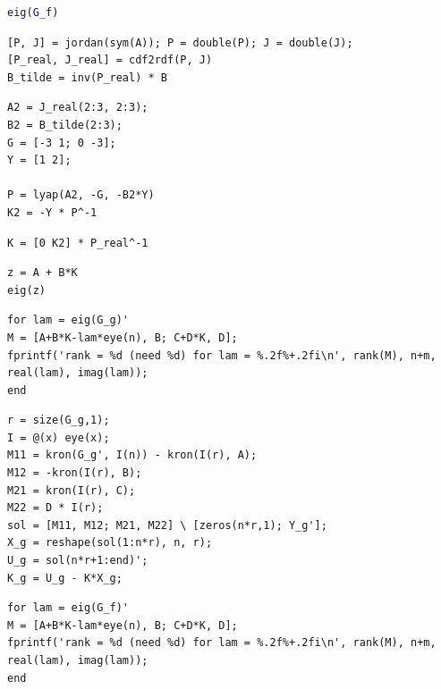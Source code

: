 \documentclass[a4paper,12pt]{article}
\begin{document}
\begin{lstlisting}[caption={Спектр \(\Gamma_f\)}, label={lst:eig1}, language=matlab]
eig(G_f)
\end{lstlisting}


\begin{lstlisting}[caption={Поиск вещественной Жордановой формы}, label={lst:jordan1}]
[P, J] = jordan(sym(A)); P = double(P); J = double(J);
[P_real, J_real] = cdf2rdf(P, J)
B_tilde = inv(P_real) * B
\end{lstlisting}

\begin{lstlisting}[caption={Решение уравнения Сильвестра}, label={lst:silv1}]
A2 = J_real(2:3, 2:3);
B2 = B_tilde(2:3);
G = [-3 1; 0 -3];
Y = [1 2];

P = lyap(A2, -G, -B2*Y)
K2 = -Y * P^-1
\end{lstlisting}

\begin{lstlisting}[caption={Перевод \(\hat K_c\) в исходный базис}, label={lst:origK11}]
K = [0 K2] * P_real^-1
\end{lstlisting}

\begin{lstlisting}[caption={Собственные числа матрицы замкнутой системы}, label={lst:eigA}]
z = A + B*K
eig(z)
\end{lstlisting}

\begin{lstlisting}[caption={Проверка разрешимости}, label={lst:checkkg}]
for lam = eig(G_g)'
M = [A+B*K-lam*eye(n), B; C+D*K, D];
fprintf('rank = %d (need %d) for lam = %.2f%+.2fi\n', rank(M), n+m, real(lam), imag(lam));
end
\end{lstlisting}

\begin{lstlisting}[caption={Синтез \(K_g\)}, label={lst:solvekg}]
r = size(G_g,1);
I = @(x) eye(x);
M11 = kron(G_g', I(n)) - kron(I(r), A);
M12 = -kron(I(r), B);
M21 = kron(I(r), C);
M22 = D * I(r);
sol = [M11, M12; M21, M22] \ [zeros(n*r,1); Y_g'];
X_g = reshape(sol(1:n*r), n, r);
U_g = sol(n*r+1:end)';
K_g = U_g - K*X_g;
\end{lstlisting}

\begin{lstlisting}[caption={Проверка разрешимости}, label={lst:checkkf}]
for lam = eig(G_f)'
M = [A+B*K-lam*eye(n), B; C+D*K, D];
fprintf('rank = %d (need %d) for lam = %.2f%+.2fi\n', rank(M), n+m, real(lam), imag(lam));
end
\end{lstlisting}
\end{document}
